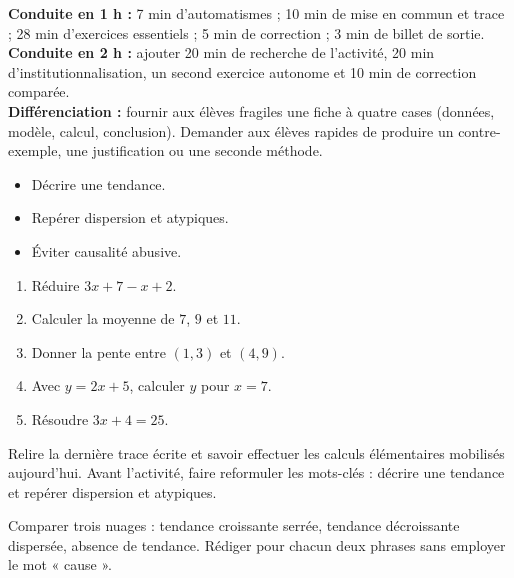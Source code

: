 \ifprof
\begin{methode}
\textbf{Conduite en 1 h :} 7 min d'automatismes ; 10 min de mise en commun et trace ; 28 min d'exercices essentiels ; 5 min de correction ; 3 min de billet de sortie.\\
\textbf{Conduite en 2 h :} ajouter 20 min de recherche de l'activité, 20 min d'institutionnalisation, un second exercice autonome et 10 min de correction comparée.\\
\textbf{Différenciation :} fournir aux élèves fragiles une fiche à quatre cases (données, modèle, calcul, conclusion). Demander aux élèves rapides de produire un contre-exemple, une justification ou une seconde méthode.
\end{methode}
\fi
{}
\begin{objectifs}\begin{itemize}\item Décrire une tendance.\item Repérer dispersion et atypiques.\item Éviter causalité abusive.\end{itemize}\end{objectifs}
\begin{automatismes}\begin{enumerate}\item Réduire $3x+7-x+2$. \item Calculer la moyenne de $7$, $9$ et $11$. \item Donner la pente entre $(1,3)$ et $(4,9)$. \item Avec $y=2x+5$, calculer $y$ pour $x=7$. \item Résoudre $3x+4=25$. \end{enumerate}\end{automatismes}
\begin{prerequis}Relire la dernière trace écrite et savoir effectuer les calculs élémentaires mobilisés aujourd'hui. Avant l'activité, faire reformuler les mots-clés : décrire une tendance et repérer dispersion et atypiques.\end{prerequis}

\begin{activite}
Comparer trois nuages : tendance croissante serrée, tendance décroissante dispersée, absence de tendance. Rédiger pour chacun deux phrases sans employer le mot « cause ».

\end{activite}


